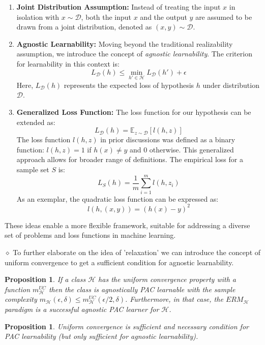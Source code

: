 \documentclass[11pt,reqno]{amsart}
\newtheorem{proposition}[theorem]{Proposition}
\theoremstyle{remark}
\begin{document}
\begin{enumerate}
\item \textbf{Joint Distribution Assumption:} 
Instead of treating the input \(x\) in isolation with \(x \sim \mathcal{D}\), both the input \(x\) and the output \(y\) are assumed to be drawn from a joint distribution, denoted as \((x,y) \sim \mathcal{D}\).

\item \textbf{Agnostic Learnability:}
Moving beyond the traditional realizability assumption, we introduce the concept of \textit{agnostic learnability}. The criterion for learnability in this context is:
\[
L_\mathcal{D}(h) \leq \min_{h' \in \mathcal{H}} L_\mathcal{D}(h') + \epsilon
\]
Here, \(L_\mathcal{D}(h)\) represents the expected loss of hypothesis \(h\) under distribution \(\mathcal{D}\).

\item \textbf{Generalized Loss Function:}
The loss function for our hypothesis can be extended as:
\[
L_\mathcal{D}(h) = \mathbb{E}_{z \sim \mathcal{D}} [l(h, z)]
\]
The loss function \(l(h,z)\) in prior discussions was defined as a binary function: \(l(h,z) = 1\) if \(h(x) \neq y\) and \(0\) otherwise. This generalized approach allows for broader range of definitions. The empirical loss for a sample set \(S\) is:
\[
L_S(h) = \frac{1}{m} \sum_{i=1}^{m} l(h, z_i)
\]
As an exemplar, the quadratic loss function can be expressed as:
\[
l(h, (x,y)) = (h(x) - y)^2
\]
\end{enumerate}

These ideas enable a more flexible framework, suitable for addressing a diverse set of problems and loss functions in machine learning.

$\diamond$ To further elaborate on the idea of 'relaxation' we can introduce the concept of uniform convergence to get a sufficient condition for agnostic learnability.

\begin{proposition}
If a class $\mathcal{H}$ has the uniform convergence property with a function $m^{UC}_{\mathcal{H}}$ then the class is agnostically
PAC learnable with the sample complexity $m_{\mathcal{H}}(\epsilon,\delta)\leq m^{UC}_{\mathcal{H}}(\epsilon/2,\delta)$. Furthermore, in that case, the $ERM_{\mathcal{H}}$ paradigm is a successful 
agnostic PAC learner for $\mathcal{H}$.
\end{proposition}
\begin{proposition}
Uniform convergence is sufficient and necessary condition for PAC learnability (but only sufficient for agnostic learnability).
\end{proposition}
\end{document}
